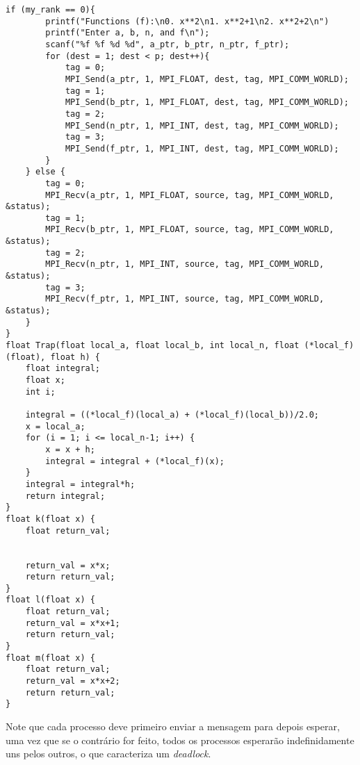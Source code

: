 \documentclass[11pt,a4paper,onecolumn]{article}
\begin{document}
\begin{lstlisting}[style=cc]
    if (my_rank == 0){
        printf("Functions (f):\n0. x**2\n1. x**2+1\n2. x**2+2\n")
        printf("Enter a, b, n, and f\n");
        scanf("%f %f %d %d", a_ptr, b_ptr, n_ptr, f_ptr);
        for (dest = 1; dest < p; dest++){
            tag = 0;
            MPI_Send(a_ptr, 1, MPI_FLOAT, dest, tag, MPI_COMM_WORLD);
            tag = 1;
            MPI_Send(b_ptr, 1, MPI_FLOAT, dest, tag, MPI_COMM_WORLD);
            tag = 2;
            MPI_Send(n_ptr, 1, MPI_INT, dest, tag, MPI_COMM_WORLD);
            tag = 3;
            MPI_Send(f_ptr, 1, MPI_INT, dest, tag, MPI_COMM_WORLD);
        }
    } else {
        tag = 0;
        MPI_Recv(a_ptr, 1, MPI_FLOAT, source, tag, MPI_COMM_WORLD, &status);
        tag = 1;
        MPI_Recv(b_ptr, 1, MPI_FLOAT, source, tag, MPI_COMM_WORLD, &status);
        tag = 2;
        MPI_Recv(n_ptr, 1, MPI_INT, source, tag, MPI_COMM_WORLD, &status);
        tag = 3;
        MPI_Recv(f_ptr, 1, MPI_INT, source, tag, MPI_COMM_WORLD, &status);
    }
}
float Trap(float local_a, float local_b, int local_n, float (*local_f)(float), float h) { 
    float integral;    
    float x; 
    int i;

    integral = ((*local_f)(local_a) + (*local_f)(local_b))/2.0; 
    x = local_a; 
    for (i = 1; i <= local_n-1; i++) { 
        x = x + h; 
        integral = integral + (*local_f)(x); 
    } 
    integral = integral*h; 
    return integral;
} 
float k(float x) { 
    float return_val; 
    
     
    return_val = x*x;
    return return_val; 
} 
float l(float x) { 
    float return_val; 
    return_val = x*x+1;
    return return_val; 
} 
float m(float x) { 
    float return_val; 
    return_val = x*x+2;
    return return_val; 
}
\end{lstlisting}

Note que cada processo deve primeiro enviar a mensagem para depois esperar, uma vez que se o contrário for feito, todos os processos esperarão indefinidamente uns pelos outros, o que caracteriza um \textit{deadlock}.
\end{document}
